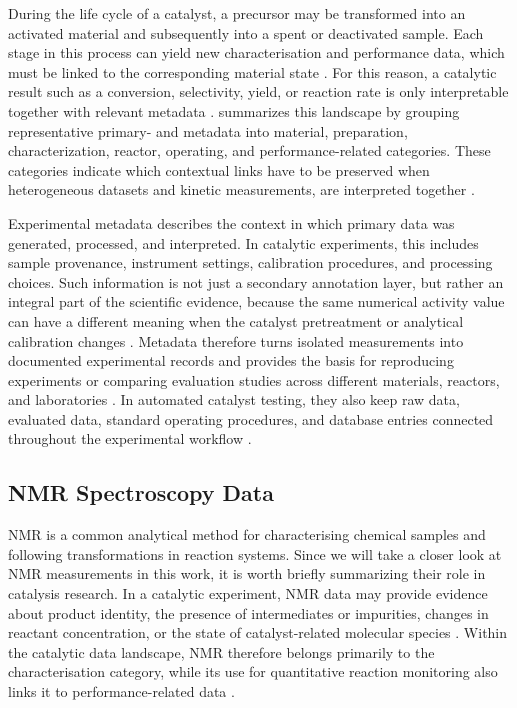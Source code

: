 During the life cycle of a catalyst, a precursor may be transformed into an activated material and subsequently into a spent or deactivated sample.
Each stage in this process can yield new characterisation and performance data, which must be linked to the corresponding material state \cite{mendes2025data}.
For this reason, a catalytic result such as a conversion, selectivity, yield, or reaction rate is only interpretable together with relevant metadata \cite{wulf2021unified}.
 summarizes this landscape by grouping representative primary- and metadata into material, preparation, characterization, reactor, operating, and performance-related categories.
These categories indicate which contextual links have to be preserved when heterogeneous datasets and kinetic measurements, are interpreted together \cite{mendes2025data,schumann2025nomad,stroemert2026chemdcat}.



Experimental metadata describes the context in which primary data was generated, processed, and interpreted.
In catalytic experiments, this includes sample provenance, instrument settings, calibration procedures, and processing choices.
Such information is not just a secondary annotation layer, but rather an integral part of the scientific evidence, because the same numerical activity value can have a different meaning when the catalyst pretreatment or analytical calibration changes \cite{wulf2021unified}.
Metadata therefore turns isolated measurements into documented experimental records and provides the basis for reproducing experiments or comparing evaluation studies across different materials, reactors, and laboratories \cite{wulf2021unified,salim2026methane}.
In automated catalyst testing, they also keep raw data, evaluated data, standard operating procedures, and database entries connected throughout the experimental workflow \cite{moshantaf2024advancing}.

\subsection{NMR Spectroscopy Data}
\label{subsec:nmr-spectroscopy-data}

\ac{NMR} is a common analytical method for characterising chemical samples and following transformations in reaction systems.
Since we will take a closer look at \ac{NMR} measurements in this work, it is worth briefly summarizing their role in catalysis research.
In a catalytic experiment, \ac{NMR} data may provide evidence about product identity, the presence of intermediates or impurities, changes in reactant concentration, or the state of catalyst-related molecular species \cite{marshall2023digital,mendes2025data}.
Within the catalytic data landscape, \ac{NMR} therefore belongs primarily to the characterisation category, while its use for quantitative reaction monitoring also links it to performance-related data \cite{mendes2025data}.

